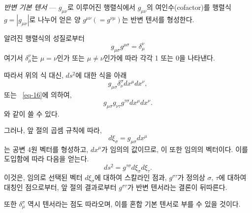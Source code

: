 \documentclass[b5paper]{article}
\begin{document}
\emph{반변 기본 텐서} --- 
$g_{\mu\nu}$로 이루어진 행렬식에서 $g_{\mu\nu}$의 여인수(cofactor)를 행렬식 $g=\left|g_{\mu\nu}\right|$로 나누어 얻은 양 $g^{\mu\nu}(=g^{\nu\mu})$는 반변 텐서를 형성한다.\par
알려진 행렬식의 성질로부터
\begin{equation} \label{eq-16}
	g_{\mu\sigma} g^{\mu\sigma} = \delta_\mu^\nu
\end{equation}
여기서 $\delta_\mu^\nu$는 $\mu=\nu$인가 또는 $\mu\ne\nu$인가에 따라 각각 1 또는 0을 나타낸다.

따라서 위의 식 대신, $ds^2$에 대한 식을 아래
\[g_{\mu\sigma}\delta_\nu^\sigma dx^\mu dx^\nu ,\]
또는 ~\eqref{eq-16}에 의하여,
\[g_{\mu\sigma} g_{\nu\tau} g^{\tau\sigma} dx^\mu dx^\nu .\]
와 같이 쓸 수 있다.

그러나, 앞 절의 곱셈 규칙에 따라,
\[d\xi_\sigma = g_{\mu\sigma}dx^\mu\]
는 공변 4원 벡터를 형성하고, $dx^\mu$가 임의의 값이므로, 이 또한 임의의 벡터이다. 이를 도입함에 따라 다음을 얻는다.
\[ds^2=g^{\tau\sigma} d\xi_\sigma d\xi_\tau .\]
이것은, 임의로 선택된 벡터 $d\xi_\sigma$에 대하여 스칼라인 점과,  $g^{\sigma\tau}$가 정의상 \ind{} $\sigma$, $\tau$에 대하여 대칭인 점으로부터, 앞 절의 결과로부터  $g^{\sigma\tau}$가 반변 텐서라는 결론이 뒤따른다.

또한 $\delta_\mu^\sigma$ 역시 텐서라는 점도 따라오며, 이를 혼합 기본 텐서로 부를 수 있을 것이다.
\end{document}
